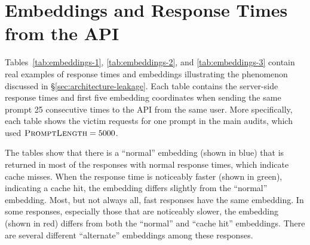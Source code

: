 \section{Embeddings and Response Times from the \OpenAI{} \OpenAIEmbeddingModel{} API}
\label{app:embeddings-openai}

Tables~\ref{tab:embeddings-1}, \ref{tab:embeddings-2}, and \ref{tab:embeddings-3} contain real examples of response times and embeddings illustrating the phenomenon discussed in \S\ref{sec:architecture-leakage}. Each table contains the server-side response times and first five embedding coordinates when sending the same prompt 25 consecutive times to the \OpenAI{} \OpenAIEmbeddingModel{} API from the same user. More specifically, each table shows the victim requests for one prompt in the main audits, which used $\textsc{PromptLength} = 5000$.

The tables show that there is a ``normal'' embedding (shown in blue) that is returned in most of the responses with normal response times, which indicate cache misses. When the response time is noticeably faster (shown in green), indicating a cache hit, the embedding differs slightly from the ``normal'' embedding. Most, but not always all, fast responses have the same embedding. In some responses, especially those that are noticeably slower, the embedding (shown in red) differs from both the ``normal'' and ``cache hit'' embeddings. There are several different ``alternate'' embeddings among these responses.

\newcommand{\EmbeddingsTableCaption}{Server-side response times and first five embedding coordinates when sending the same prompt 25 consecutive times to the \OpenAI{} \OpenAIEmbeddingModel{} API from the same user. \colorbox{\NormalEmbeddingColor}{Blue} denotes the ``normal'' embedding returned in most of the responses with normal response times, which indicate cache misses. \colorbox{\FastEmbeddingColor}{Green} denotes fast response times, which indicate cache hits. \colorbox{\OtherEmbeddingColor}{Red} denotes embeddings that differ from both the ``normal'' and ``cache hit'' embeddings.}

